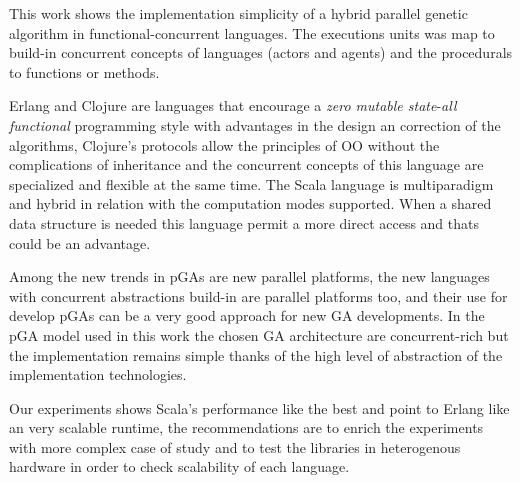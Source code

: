 
This work shows the implementation simplicity of a hybrid parallel genetic algorithm in functional-concurrent languages. The executions units was map to build-in concurrent concepts of languages (actors and agents) and the procedurals to functions or methods.

Erlang and Clojure are languages that encourage a \emph{zero mutable state}-\emph{all functional} programming style with advantages in the design an correction of the algorithms, Clojure's protocols allow the principles of OO without the complications of inheritance and the concurrent concepts of this language are specialized and flexible at the same time. The Scala language is multiparadigm and hybrid in relation with the computation modes supported. When a shared data structure is needed this language permit a more direct access and thats could be an advantage.

Among the new trends in pGAs are new parallel platforms, the new languages with concurrent abstractions build-in are parallel platforms too, and their use for develop pGAs can be a very good approach for new GA developments. In the pGA model used in this work the chosen GA architecture are concurrent-rich but the implementation remains simple thanks of the high level of abstraction of the implementation technologies.

Our experiments shows Scala's performance like the best and point to Erlang like an very scalable runtime, the recommendations are to enrich the experiments with more complex case of study and to test the libraries in heterogenous hardware in order to check scalability of each language. 